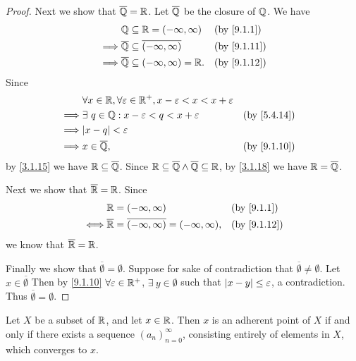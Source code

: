 \begin{proof}
  Next we show that \(\overline{\mathbb{Q}} = \mathbb{R}\).
  Let \(\overline{\mathbb{Q}}\) be the closure of \(\mathbb{Q}\).
  We have
  \begin{align*}
             & \Q \subseteq \R = (-\infty, \infty)                  &  & \text{(by \cref{9.1.1})}  \\
    \implies & \overline{\Q} \subseteq \overline{(-\infty, \infty)} &  & \text{(by \cref{9.1.11})} \\
    \implies & \overline{\Q} \subseteq (-\infty, \infty) = \R.      &  & \text{(by \cref{9.1.12})}
  \end{align*}
  Since
  \begin{align*}
             & \forall x \in \R, \forall \varepsilon \in \R^+, x - \varepsilon < x < x + \varepsilon                                \\
    \implies & \exists\ q \in \Q : x - \varepsilon < q < x + \varepsilon                             &  & \text{(by \cref{5.4.14})} \\
    \implies & \abs{x - q} < \varepsilon                                                                                            \\
    \implies & x \in \overline{\Q},                                                                  &  & \text{(by \cref{9.1.10})}
  \end{align*}
  by \cref{3.1.15} we have \(\mathbb{R} \subseteq \overline{\mathbb{Q}}\).
  Since \(\mathbb{R} \subseteq \overline{\mathbb{Q}} \land \overline{\mathbb{Q}} \subseteq \mathbb{R}\), by \cref{3.1.18} we have \(\mathbb{R} = \overline{\mathbb{Q}}\).

  Next we show that \(\overline{\mathbb{R}} = \mathbb{R}\).
  Since
  \begin{align*}
         & \R = (-\infty, \infty)                                            &  & \text{(by \cref{9.1.1})}  \\
    \iff & \overline{\R} = \overline{(-\infty, \infty)} = (-\infty, \infty), &  & \text{(by \cref{9.1.12})}
  \end{align*}
  we know that \(\overline{\mathbb{R}} = \mathbb{R}\).

  Finally we show that \(\overline{\emptyset} = \emptyset\).
  Suppose for sake of contradiction that \(\overline{\emptyset} \neq \emptyset\).
  Let \(x \in \overline{\emptyset}\)
  Then by \cref{9.1.10} \(\forall \varepsilon \in \mathbb{R}^+\), \(\exists\ y \in \emptyset\) such that \(\left\lvert x - y\right\rvert \leq \varepsilon\), a contradiction.
  Thus \(\overline{\emptyset} = \emptyset\).
\end{proof}

\begin{lem}\label{9.1.14}
  Let \(X\) be a subset of \(\mathbb{R}\), and let \(x \in \mathbb{R}\).
  Then \(x\) is an adherent point of \(X\) if and only if there exists a sequence \((a_n)_{n = 0}^\infty\), consisting entirely of elements in \(X\), which converges to \(x\).
\end{lem}


